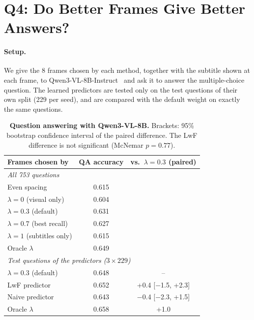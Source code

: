 \documentclass[10pt,twocolumn,letterpaper]{article}
\newcommand{\lam}{\lambda}
\begin{document}
\section{Q4: Do Better Frames Give Better Answers?}
\label{sec:q4}

\paragraph{Setup.}
We give the 8 frames chosen by each method, together with the subtitle shown at each frame, to Qwen3-VL-8B-Instruct~\cite{bai2025qwen3vl} and ask it to answer the multiple-choice question.
The learned predictors are tested only on the test questions of their own split (229 per seed), and are compared with the default weight on exactly the same questions.

\begin{table}[t]
  \centering
  \small
  \setlength{\tabcolsep}{5pt}
  \begin{tabular}{lcc}
    \toprule
    Frames chosen by & QA accuracy & vs.\ $\lam=0.3$ (paired) \\
    \midrule
    \multicolumn{3}{l}{\emph{All 753 questions}} \\
    Even spacing & 0.615 & \\
    $\lam=0$ (visual only) & 0.604 & \\
    $\lam=0.3$ (default) & 0.631 & \\
    $\lam=0.7$ (best recall) & 0.627 & \\
    $\lam=1$ (subtitles only) & 0.615 & \\
    Oracle $\lam$ & 0.649 & \\
    \midrule
    \multicolumn{3}{l}{\emph{Test questions of the predictors ($3\times229$)}} \\
    $\lam=0.3$ (default) & 0.648 & -- \\
    LwF predictor & 0.652 & +0.4 \small{[$-$1.5, +2.3]} \\
    Naive predictor & 0.643 & $-$0.4 \small{[$-$2.3, +1.5]} \\
    Oracle $\lam$ & 0.658 & +1.0 \\
    \bottomrule
  \end{tabular}
  \caption{\textbf{Question answering with Qwen3-VL-8B.} Brackets: 95\% bootstrap confidence interval of the paired difference. The LwF difference is not significant (McNemar $p=0.77$).}
  \label{tab:qa}
\end{table}
\end{document}
